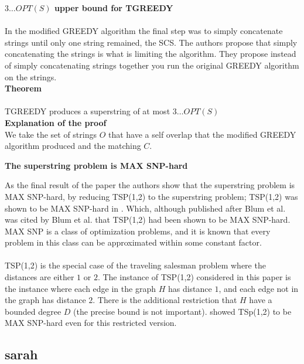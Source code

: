 \documentclass[letterpaper,11pt,titlepage]{article}
\begin{document}
\textbf{$3 \ldots OPT(S)$ upper bound for TGREEDY}\\\\

In the modified GREEDY algorithm the final step was to simply concatenate strings until only one string remained, the SCS. The authors propose that simply concatenating the strings is what is limiting the algorithm. They propose instead of simply concatenating strings together you run the original GREEDY algorithm on the strings. \\

\textbf{Theorem} \\\\
TGREEDY produces a superstring of at most $3 \ldots OPT(S)$\\

\textbf{Explanation of the proof}\\

We take the set of strings $O$ that have a self overlap that the modified GREEDY algorithm produced and the matching $C$. 


\textbf{The superstring problem is MAX SNP-hard}

As the final result of the paper the authors show that the superstring problem is MAX SNP-hard, by reducing TSP(1,2) to the superstring problem; TSP(1,2) was shown to be MAX SNP-hard in \cite{papadimitriou1993}.  Which, although published after Blum et al. was cited by Blum et al. that TSP(1,2) had been shown to be MAX SNP-hard.  MAX SNP is a class of optimization problems, and it is known that every problem in this class can be approximated within some constant factor.  \\ \\

TSP(1,2) is the special case of the traveling salesman problem where the distances are either $1$ or $2$.  The instance of TSP(1,2) considered in this paper is the instance where each edge in the graph $H$ has distance $1$, and each edge not in the graph has distance $2$.  There is the additional restriction that $H$ have a bounded degree $D$ (the precise bound is not important).  \cite{papadimitriou1993} showed TSp(1,2) to be MAX SNP-hard even for this restricted version.  

\subsection{sarah}
\end{document}
